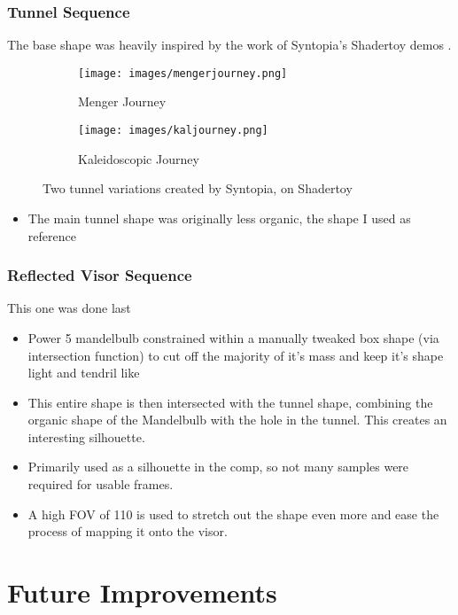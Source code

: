 \documentclass[11pt,a4paper,final,notitlepage]{report}
\begin{document}
\subsection{Tunnel Sequence}
The base shape was heavily inspired by the work of Syntopia's Shadertoy demos \cite{mengerjourney} \cite{kaljourney}.

\begin{figure}
\centering
\begin{subfigure}{.5\textwidth}
  \centering
  \texttt{[image: images/mengerjourney.png]}
  \caption{Menger Journey \cite{mengerjourney}}
  \label{fig:sub1}
\end{subfigure}%
\begin{subfigure}{.5\textwidth}
  \centering
  \texttt{[image: images/kaljourney.png]}
  \caption{Kaleidoscopic Journey \cite{kaljourney}}
  \label{fig:sub2}
\end{subfigure}
\caption{Two tunnel variations created by Syntopia, on Shadertoy}
\label{fig:test}
\end{figure}

\begin{itemize}
	\item The main tunnel shape was originally less organic, the shape I used as reference
\end{itemize}

\subsection{Reflected Visor Sequence}
This one was done last

\begin{itemize}
\item Power 5 mandelbulb constrained within a manually tweaked box shape (via intersection function)
to cut off the majority of it’s mass and keep it’s shape light and tendril like
\item This entire shape is then intersected with the tunnel shape, combining the organic shape of
the Mandelbulb with the hole in the tunnel. This creates an interesting silhouette.
\item Primarily used as a silhouette in the comp, so not many samples were required for usable
frames.
\item A high FOV of 110 is used to stretch out the shape even more and ease the process of mapping
it onto the visor.
\end{itemize}

\chapter{Future Improvements}
\end{document}
